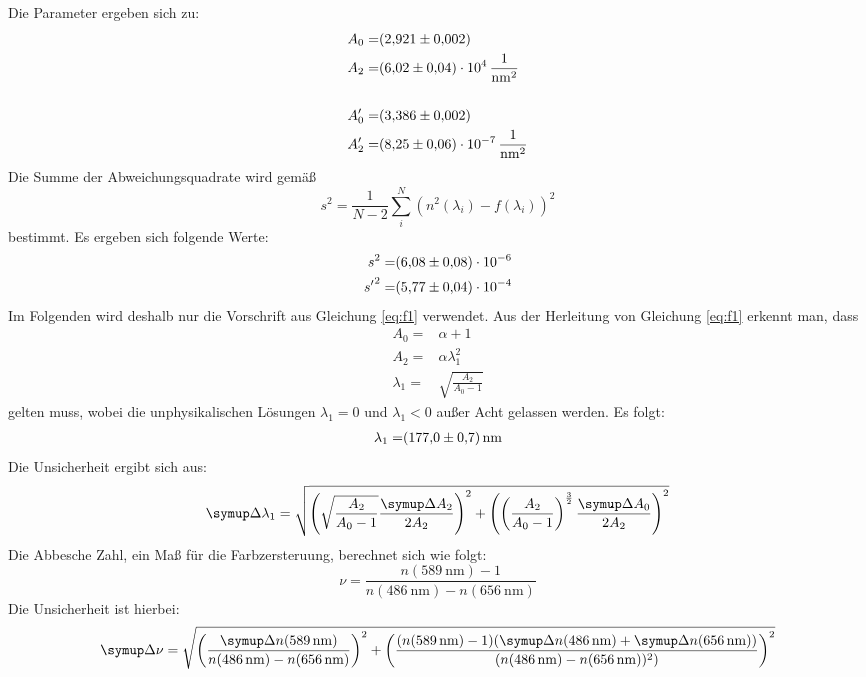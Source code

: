 \noindent
Die Parameter ergeben sich zu:
\begin{align}
	A_0 =& \SI{2.921\pm0.002}{} \\
	A_2 =& \SI{6.02\pm0.04e4}{\per\nano\meter\squared} \\
\nonumber \\
	A_0' =& \SI{3.386\pm0.002}{} \\
	A_2' =& \SI{8.25\pm0.06e-7}{\per\nano\meter\squared} \\
\end{align}
Die Summe der Abweichungsquadrate wird gemäß
\begin{equation}
	s^2 = \frac{1}{N-2}\sum_i^N\left(n^2(\lambda_i) - f(\lambda_i)\right)^2
\end{equation}
bestimmt.
Es ergeben sich folgende Werte:
\begin{align}
	s^2 =& \num{6.08\pm0.08e-6} \\
	{s'}^2 =& \num{5.77\pm0.04e-4} 
\end{align}
Im Folgenden wird deshalb nur die Vorschrift aus Gleichung \eqref{eq:f1} verwendet.
Aus der Herleitung von Gleichung \eqref{eq:f1} erkennt man, dass
\begin{align}
	A_0 =& \alpha + 1 \\
	A_2 =& \alpha\lambda_1^2 \\
	\lambda_1 =& \sqrt{\frac{A_2}{A_0 - 1}} 
\end{align}
gelten muss,
wobei die unphysikalischen Lösungen $\lambda_1 = 0$ und $\lambda_1 < 0$ außer Acht gelassen werden.
Es folgt:
\begin{align}
	\lambda_1 =& \SI{177.0\pm0.7}{\nano\meter} \\
\end{align}
Die Unsicherheit ergibt sich aus:
\begin{equation}
	\symup\Delta\lambda_1 = \sqrt{\left(\sqrt{\frac{A_2}{A_0-1}}\frac{\symup\Delta A_2}{2A_2}\right)^2 + \left(\left(\frac{A_2}{A_0-1}\right)^\frac{3}{2}\frac{\symup\Delta A_0}{2A_2}\right)^2 }
\end{equation}
Die Abbesche Zahl, ein Maß für die Farbzersteruung, berechnet sich wie folgt:
\begin{equation}
	\nu = \frac{n(\SI{589}{\nano\meter})-1}{n(\SI{486}{\nano\meter})-n(\SI{656}{\nano\meter})}
\end{equation}
Die Unsicherheit ist hierbei:
\begin{equation}
	\symup\Delta\nu = \sqrt{
		\left( \frac{\symup\Delta n(\SI{589}{\nano\meter})}{n(\SI{486}{\nano\meter})-n(\SI{656}{\nano\meter})} \right)^2 +
		\left( \frac{(n(\SI{589}{\nano\meter})-1)(\symup\Delta n(\SI{486}{\nano\meter})+\symup\Delta n(\SI{656}{\nano\meter}))}{(n(\SI{486}{\nano\meter})-n(\SI{656}{\nano\meter}))^2)}\right)^2}
\end{equation}
